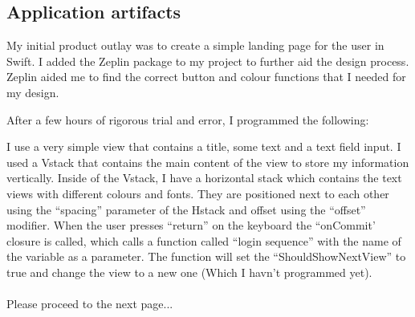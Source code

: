 \documentclass[a4paper, 11pt]{report}
\begin{document}
\subsection{Application artifacts}
My initial product outlay was to create a simple landing page for the user in Swift. I added the Zeplin package to my project to further aid the design process. Zeplin aided me to find the correct button and colour functions that I needed for my design. 

After a few hours of rigorous trial and error, I programmed the following:

I use a very simple view that contains a title, some text and a text field input. I used a Vstack that contains the main content of the view to store my information vertically. Inside of the Vstack, I have a horizontal stack which contains the text views with different colours and fonts. They are positioned next to each other using the “spacing” parameter of the Hstack and offset using the “offset” modifier.
When the user presses “return” on the keyboard the “onCommit’ closure is called, which calls a function called “login sequence” with the name of the variable as a parameter. The function will set the “ShouldShowNextView” to true and change the view to a new one (Which I havn’t programmed yet).
\\
\\
Please proceed to the next page...
\end{document}
